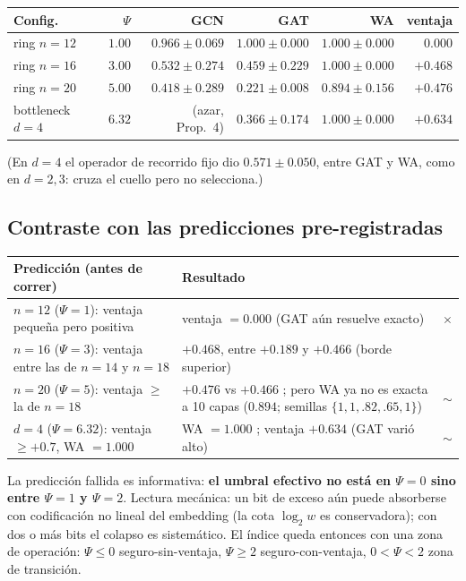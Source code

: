 \documentclass[11pt]{article}
\newcommand{\ok}{\textcolor{green!50!black}{\checkmark}}
\newcommand{\falla}{\textcolor{red!70!black}{$\times$}}
\begin{document}
\begin{center}
\begin{tabular}{lrrrrr}
\toprule
\textbf{Config.} & $\Psi$ & \textbf{GCN} & \textbf{GAT} & \textbf{WA} &
\textbf{ventaja}\\
\midrule
ring $n{=}12$ & $1.00$ & $0.966\pm0.069$ & $1.000\pm0.000$ &
$1.000\pm0.000$ & $0.000$\\
ring $n{=}16$ & $3.00$ & $0.532\pm0.274$ & $0.459\pm0.229$ &
$1.000\pm0.000$ & $+0.468$\\
ring $n{=}20$ & $5.00$ & $0.418\pm0.289$ & $0.221\pm0.008$ &
$0.894\pm0.156$ & $+0.476$\\
bottleneck $d{=}4$ & $6.32$ & (azar, Prop.~4) & $0.366\pm0.174$ &
$1.000\pm0.000$ & $+0.634$\\
\bottomrule
\end{tabular}
\end{center}

(En $d{=}4$ el operador de recorrido fijo dio $0.571\pm0.050$, entre GAT y
WA, como en $d{=}2,3$: cruza el cuello pero no selecciona.)

\subsection{Contraste con las predicciones pre-registradas}

\begin{center}\small
\begin{tabular}{p{4.5cm}p{5.4cm}l}
\toprule
\textbf{Predicci\'on (antes de correr)} & \textbf{Resultado} & \\
\midrule
$n{=}12$ ($\Psi{=}1$): ventaja peque\~na pero positiva &
ventaja $=0.000$ (GAT a\'un resuelve exacto) & \falla\\
$n{=}16$ ($\Psi{=}3$): ventaja entre las de $n{=}14$ y $n{=}18$ &
$+0.468$, entre $+0.189$ y $+0.466$ (borde superior) & \ok\\
$n{=}20$ ($\Psi{=}5$): ventaja $\ge$ la de $n{=}18$ & $+0.476$ vs
$+0.466$ \ok; pero WA ya no es exacta a 10 capas ($0.894$; semillas
$\{1,1,.82,.65,1\}$) & \ok$\sim$\\
$d{=}4$ ($\Psi{=}6.32$): ventaja $\ge+0.7$, WA $=1.000$ &
WA $=1.000$ \ok; ventaja $+0.634$ (GAT vari\'o alto) & $\sim$\\
\bottomrule
\end{tabular}
\end{center}

La predicci\'on fallida es informativa: \textbf{el umbral efectivo no est\'a
en $\Psi=0$ sino entre $\Psi=1$ y $\Psi=2$}. Lectura mec\'anica: un bit de
exceso a\'un puede absorberse con codificaci\'on no lineal del embedding
(la cota $\log_2 w$ es conservadora); con dos o m\'as bits el colapso es
sistem\'atico. El \'indice queda entonces con una zona de operaci\'on:
$\Psi\le0$ seguro-sin-ventaja, $\Psi\ge2$ seguro-con-ventaja, $0<\Psi<2$
zona de transici\'on.
\end{document}
